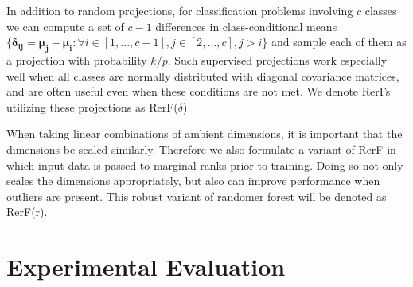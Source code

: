 \documentclass{article} %
\begin{document}
In addition to random projections, for classification problems involving $c$ classes we can compute a set of $c-1$ differences in class-conditional means $\{\boldsymbol{\delta_{ij}} = \boldsymbol{\mu_j} - \boldsymbol{\mu_i}: \forall i \in [1,...,c-1], j \in [2,...,c], j>i\}$ and sample each of them as a projection with probability $k/p$. Such supervised projections work especially well when all classes are normally distributed with diagonal covariance matrices, and are often useful even when these conditions are not met. We denote RerFs utilizing these projections as RerF($\delta$)

When taking linear combinations of ambient dimensions, it is important that the dimensions be scaled similarly. Therefore we also formulate a variant of RerF in which input data is passed to marginal ranks prior to training. Doing so not only scales the dimensions appropriately, but also can improve performance when outliers are present. This robust variant of randomer forest will be denoted as RerF(r).

\section{Experimental Evaluation}
\end{document}

